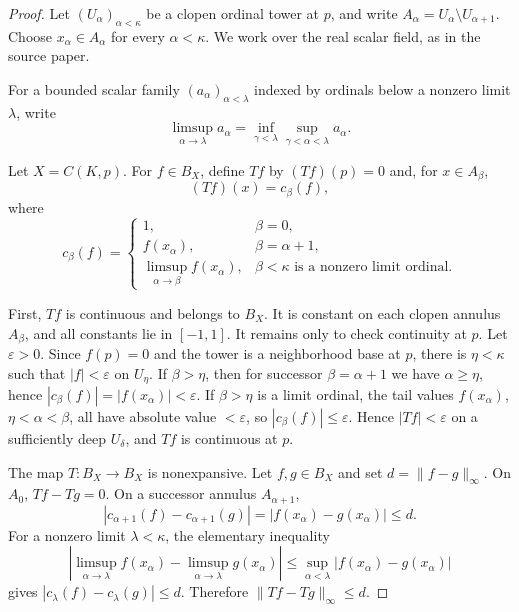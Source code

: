 \documentclass[11pt]{article}
\begin{document}
\begin{proof}
Let \((U_\alpha)_{\alpha<\kappa}\) be a clopen ordinal tower at \(p\), and
write \(A_\alpha=U_\alpha\setminus U_{\alpha+1}\).  Choose
\(x_\alpha\in A_\alpha\) for every \(\alpha<\kappa\).  We work over the real
scalar field, as in the source paper.

For a bounded scalar family \((a_\alpha)_{\alpha<\lambda}\) indexed by ordinals
below a nonzero limit \(\lambda\), write
\[
  \limsup_{\alpha\to\lambda} a_\alpha
  =
  \inf_{\gamma<\lambda}\sup_{\gamma<\alpha<\lambda} a_\alpha .
\]

Let \(X=C(K,p)\).  For \(f\in B_X\), define \(Tf\) by \((Tf)(p)=0\) and, for
\(x\in A_\beta\),
\[
  (Tf)(x)=c_\beta(f),
\]
where
\[
c_\beta(f)=
\begin{cases}
1, & \beta=0,\\
f(x_\alpha), & \beta=\alpha+1,\\
\displaystyle\limsup_{\alpha\to\beta} f(x_\alpha),
  & \beta<\kappa \text{ is a nonzero limit ordinal.}
\end{cases}
\]

First, \(Tf\) is continuous and belongs to \(B_X\).  It is constant on each
clopen annulus \(A_\beta\), and all constants lie in \([-1,1]\).  It remains
only to check continuity at \(p\).  Let \(\varepsilon>0\).  Since \(f(p)=0\)
and the tower is a neighborhood base at \(p\), there is \(\eta<\kappa\) such
that \(|f|<\varepsilon\) on \(U_\eta\).  If \(\beta>\eta\), then for successor
\(\beta=\alpha+1\) we have \(\alpha\ge\eta\), hence
\(|c_\beta(f)|=|f(x_\alpha)|<\varepsilon\).  If \(\beta>\eta\) is a limit
ordinal, the tail values \(f(x_\alpha)\), \(\eta<\alpha<\beta\), all have
absolute value \(<\varepsilon\), so
\(|c_\beta(f)|\le\varepsilon\).  Hence \(|Tf|<\varepsilon\) on a sufficiently
deep \(U_\delta\), and \(Tf\) is continuous at \(p\).

The map \(T:B_X\to B_X\) is nonexpansive.  Let \(f,g\in B_X\) and set
\(d=\|f-g\|_\infty\).  On \(A_0\), \(Tf-Tg=0\).  On a successor annulus
\(A_{\alpha+1}\),
\[
  |c_{\alpha+1}(f)-c_{\alpha+1}(g)|
  =
  |f(x_\alpha)-g(x_\alpha)|
  \le d.
\]
For a nonzero limit \(\lambda<\kappa\), the elementary inequality
\[
 \left|
 \limsup_{\alpha\to\lambda} f(x_\alpha)
 -
 \limsup_{\alpha\to\lambda} g(x_\alpha)
 \right|
 \le
 \sup_{\alpha<\lambda}|f(x_\alpha)-g(x_\alpha)|
\]
gives \(|c_\lambda(f)-c_\lambda(g)|\le d\).  Therefore
\(\|Tf-Tg\|_\infty\le d\).


\end{proof}
\end{document}
